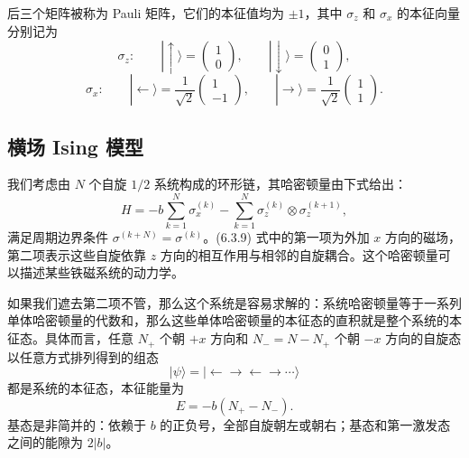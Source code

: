 后三个矩阵被称为 Pauli 矩阵，它们的本征值均为 $\pm1$，其中 $\sigma_z$ 和 $\sigma_x$ 的本征向量分别记为
\begin{equation}
 \sigma_z:\qquad |\uparrow\rangle=\begin{pmatrix}1\\0\end{pmatrix},\qquad |\downarrow\rangle=\begin{pmatrix}0\\1\end{pmatrix},
\tag{6.3.7}
\end{equation}
\begin{equation}
 \sigma_x:\qquad |\leftarrow\rangle=\frac1{\sqrt2}\begin{pmatrix}1\\-1\end{pmatrix},\qquad
 |\rightarrow\rangle=\frac1{\sqrt2}\begin{pmatrix}1\\1\end{pmatrix}.
\tag{6.3.8}
\end{equation}

\subsection{横场 Ising 模型}

我们考虑由 $N$ 个自旋 $1/2$ 系统构成的环形链，其哈密顿量由下式给出：
\begin{equation}
 H=-b\sum_{k=1}^{N}\sigma_x^{(k)}-\sum_{k=1}^{N}\sigma_z^{(k)}\otimes\sigma_z^{(k+1)},
\tag{6.3.9}
\end{equation}
满足周期边界条件 $\sigma^{(k+N)}=\sigma^{(k)}$。(6.3.9) 式中的第一项为外加 $x$ 方向的磁场，第二项表示这些自旋依靠 $z$ 方向的相互作用与相邻的自旋耦合。这个哈密顿量可以描述某些铁磁系统的动力学。

如果我们遮去第二项不管，那么这个系统是容易求解的：系统哈密顿量等于一系列单体哈密顿量的代数和，那么这些单体哈密顿量的本征态的直积就是整个系统的本征态。具体而言，任意 $N_+$ 个朝 $+x$ 方向和 $N_-=N-N_+$ 个朝 $-x$ 方向的自旋态以任意方式排列得到的组态
\begin{equation}
 |\psi\rangle=|\leftarrow\rightarrow\leftarrow\rightarrow\cdots\rangle
\tag{6.3.10}
\end{equation}
都是系统的本征态，本征能量为
\begin{equation}
 E=-b(N_+-N_-).
\tag{6.3.11}
\end{equation}
基态是非简并的：依赖于 $b$ 的正负号，全部自旋朝左或朝右；基态和第一激发态之间的能隙为 $2|b|$。

